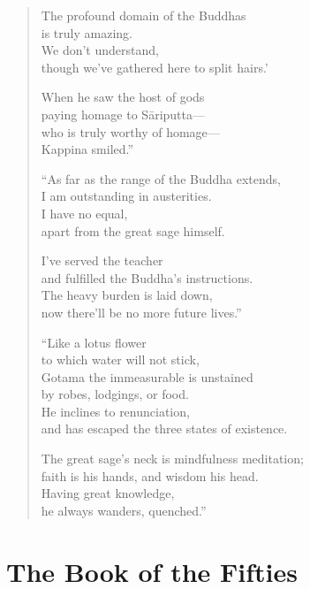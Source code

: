 \documentclass[12pt,openany]{book}%
\let\oldcontentsline\contentsline
\newcommand{\nopagecontentsline}[3]{\oldcontentsline{#1}{#2}{}}
\begin{document}
\begin{verse}
The profound domain of the Buddhas \\
is truly amazing. \\
We don’t understand, \\
though we’ve gathered here to split hairs.’ 

When he saw the host of gods \\
paying homage to \textsanskrit{Sāriputta}—\\
who is truly worthy of homage—\\
Kappina smiled.” 

“As far as the range of the Buddha extends, \\
I am outstanding in austerities. \\
I have no equal, \\
apart from the great sage himself. 

I’ve served the teacher \\
and fulfilled the Buddha’s instructions. \\
The heavy burden is laid down, \\
now there’ll be no more future lives.” 

“Like a lotus flower \\
to which water will not stick, \\
Gotama the immeasurable is unstained \\
by robes, lodgings, or food. \\
He inclines to renunciation, \\
and has escaped the three states of existence. 

The great sage’s neck is mindfulness meditation; \\
faith is his hands, and wisdom his head. \\
Having great knowledge, \\
he always wanders, quenched.” 

%
\end{verse}

%
\part*{The Book of the Fifties }
\markboth{}{}
\addtocontents{toc}{\let\protect\contentsline\protect\oldcontentsline}

%
\end{document}
